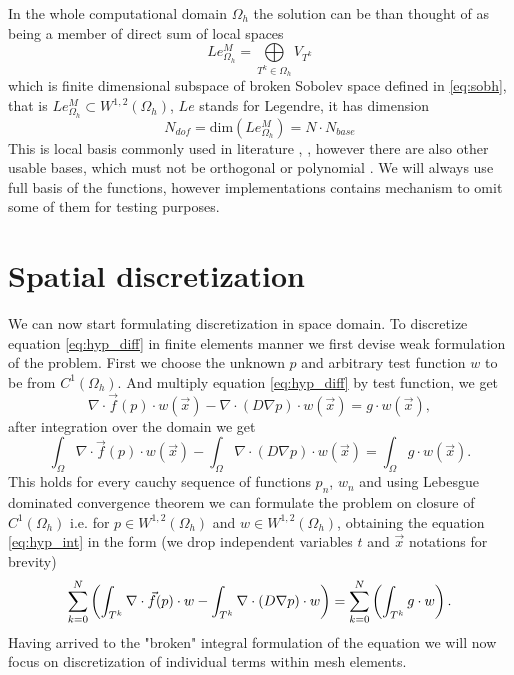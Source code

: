 In the whole computational domain $\Omega_h$ the solution can be than thought 
of as being a member of direct sum of local spaces
\begin{equation}
	Le_{\Omega_h}^{M} = \bigoplus\limits_{T^k \in \Omega_h} V_{T^k}
\end{equation}
which is finite dimensional subspace of broken Sobolev space defined in 
\eqref{eq:sobh}, 
that is $Le_{\Omega_h}^{M} \subset  W^{1,2}(\Omega_h)$, $Le$ stands for Legendre, it has 
dimension
\begin{equation}\label{eq:dim_legh}
	N_{dof} = \text{dim}(Le_{\Omega_h}^{M}) = N\cdot N_{base}
\end{equation}
This is local basis commonly used in literature \cite{Hesthaven2008}, 
\cite{Bokhove2008}, however there are also other usable bases, which must not 
be orthogonal or polynomial \cite{Yuan2006}. We will always use full 
basis of the functions, however implementations contains mechanism to omit some 
of them for testing purposes.

\newpage
\section{Spatial discretization}
We can now start formulating discretization in space domain. To discretize 
equation \eqref{eq:hyp_diff} in finite elements manner we first devise weak 
formulation of the problem. First we choose the unknown $p$ and arbitrary test 
function $w$ to be from $C^1(\Omega_h)$. And multiply equation 
\eqref{eq:hyp_diff} by test function, we get
\begin{equation}
	\nabla\cdot \vec{f}(p)\cdot w(\vec{x}) 
	-  \nabla \cdot (D \nabla p)\cdot w( 
	\vec{x}) = g\cdot w(\vec{x}),
\end{equation}
after integration over the domain we get
\begin{equation}\label{eq:hyp_int}
	 \int_{\Omega}\nabla\cdot \vec{f}(p)\cdot w(\vec{x}) 
	 - \int_{\Omega}\nabla \cdot (D \nabla p)\cdot w(\vec{x}) 
	 = \int_{\Omega}g\cdot w(\vec{x}).
\end{equation}
This holds for every cauchy sequence of functions ${p_n}$, ${w_n}$ and using 
Lebesgue dominated convergence theorem we can formulate the problem on closure 
of $C^1(\Omega_h)$ i.e. for $p \in W^{1,2}(\Omega_h)$ and  $w \in 
W^{1,2}(\Omega_h)$, obtaining the equation \eqref{eq:hyp_int} in the form (we 
drop 
independent variables $t$ and $\vec{x}$ notations for brevity) 
\begin{equation}
	\label{eq:sum_int_hyp}
	\sum\limits_{k=0}^{N}\left(
	\int_{T^k}\nabla\cdot \vec{f}(p)\cdot w
	- \int_{T^k}\nabla \cdot (D \nabla p)\cdot w 
		\right)
 	=\sum\limits_{k=0}^{N}\left(\int_{T^k} g\cdot w\right).
\end{equation}
Having arrived to the "broken" integral formulation of the equation we will now 
focus on discretization of individual terms within mesh elements.

